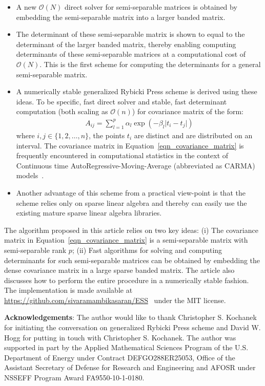 \documentclass[final,leqno]{siamltex}
\begin{document}
\begin{itemize}
\item
A new $\mathcal{O}(N)$ direct solver for semi-separable matrices is obtained by embedding the semi-separable matrix into a larger banded matrix.
\item
The determinant of these semi-separable matrix is shown to equal to the determinant of the larger banded matrix, thereby enabling computing determinants of these semi-separable matrices at a computational cost of $\mathcal{O}(N)$. This is the first scheme for computing the determinants for a general semi-separable matrix.
\item
A numerically stable generalized Rybicki Press scheme is derived using these ideas. To be specific, fast direct solver and stable, fast determinant computation (both scaling as $\mathcal{O}(n)$) for covariance matrix of the form:
\begin{align}
A_{ij} = \sum_{l=1}^p \alpha_l \exp\left(-\beta_l \vert t_i - t_j \vert\right)
\label{eqn_covariance_matrix}
\end{align}
where $i,j \in \{1,2,\ldots,n\}$, the points $t_i$ are distinct and are distributed on an interval. The covariance matrix in Equation~\eqref{eqn_covariance_matrix} is frequently encountered in computational statistics in the context of Continuous time AutoRegressive-Moving-Average (abbreviated as CARMA) models~\cite{brockwell2002introduction, brockwell2001levy, brockwell1994continuous}.
\item
Another advantage of this scheme from a practical view-point is that the scheme relies only on sparse linear algebra and thereby can easily use the existing mature sparse linear algebra libraries.
\end{itemize}

The algorithm proposed in this article relies on two key ideas: (i) The covariance matrix in Equation~\eqref{eqn_covariance_matrix} is a semi-separable matrix with semi-separable rank $p$; (ii) Fast algorithms for solving and computing determinants for such semi-separable matrices can be obtained by embedding the dense covariance matrix in a large sparse banded matrix. The article also discusses how to perform the entire procedure in a numerically stable fashion. The implementation is made available at \url{https://github.com/sivaramambikasaran/ESS}~\cite{ambikasaran2014ESS} under the MIT license.

\textbf{Acknowledgements}: The author would like to thank Christopher S. Kochanek for initiating the conversation on generalized Rybicki Press scheme and David W. Hogg for putting in touch with Christopher S. Kochanek. The author was supported in part by the Applied Mathematical Sciences Program of the U.S. Department of Energy under Contract DEFGO288ER25053, Office of the Assistant Secretary of Defense for Research and Engineering and AFOSR under NSSEFF Program Award FA9550-10-1-0180.
\end{document}
